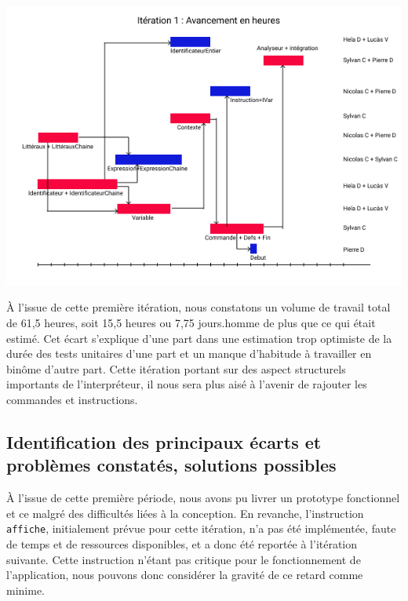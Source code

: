 \documentclass[12pt,a4paper,titlepage,openany, oneside]{report}
\begin{document}
        \includegraphics[scale=0.75]{fichiers/planification/iteration1/iteration1Avancement.png}

        \`{A} l'issue de cette première itération, nous constatons un volume de travail
        total de 61,5 heures, soit 15,5 heures ou 7,75 jours.homme de plus que ce qui était
        estimé. Cet écart s'explique d'une part dans une estimation trop optimiste de la
        durée des tests unitaires d'une part et un manque d'habitude à travailler en
        binôme d'autre part. Cette itération portant sur des aspect structurels importants
        de l'interpréteur, il nous sera plus aisé à l'avenir de rajouter les commandes
        et instructions.




    \subsection{Identification des principaux écarts et problèmes constatés, solutions possibles}
        \`{A} l'issue de cette première période, nous avons pu livrer un prototype
        fonctionnel et ce malgré des difficultés liées à la conception. En revanche,
        l'instruction \verb|affiche|, initialement prévue pour cette itération, n'a
        pas été implémentée, faute de temps et de ressources disponibles, et a donc été
        reportée à l'itération suivante. Cette instruction n'étant pas critique pour
        le fonctionnement de l'application, nous pouvons donc considérer la gravité
        de ce retard comme minime.
\end{document}
